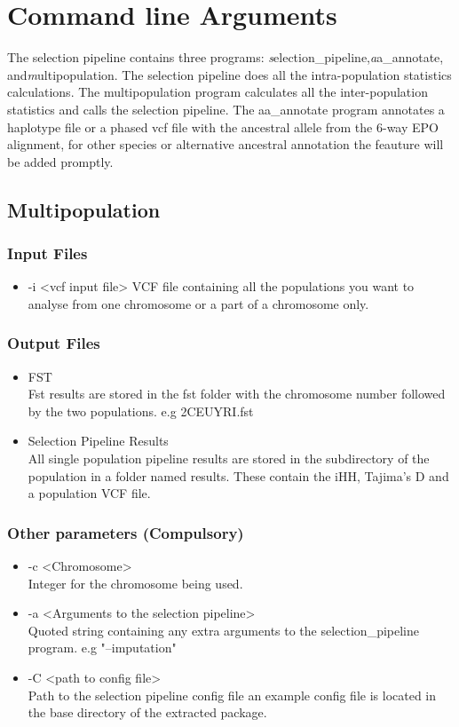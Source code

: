 \documentclass[a4paper,10pt]{article}
\begin{document}
\section{Command line Arguments}
The selection pipeline contains three programs: \emph selection\_pipeline,\emph aa\_annotate, and\emph multipopulation. The selection pipeline does all the intra-population statistics calculations. The multipopulation program calculates all the inter-population statistics and calls the selection pipeline. The aa\_annotate program annotates a haplotype file or a phased vcf file with the ancestral allele from the 6-way EPO alignment, for other species or alternative ancestral annotation the feauture will be added promptly.
\subsection{Multipopulation}
\subsubsection{Input Files}
\begin{itemize}
\item -i <vcf input file>
VCF file containing all the populations you want to analyse from one chromosome or a part of a chromosome only. 
\end{itemize}
\subsubsection{Output Files}
\begin{itemize}
\item FST \\
Fst results are stored in the fst folder with the chromosome number followed by the two populations. e.g 2CEUYRI.fst
\item Selection Pipeline Results\\
All single population pipeline results are stored in the subdirectory of the population in a folder named results. These contain the iHH, Tajima's D and a population VCF file.
\end{itemize}
\subsubsection{Other parameters (Compulsory)}
\begin{itemize}
\item -c <Chromosome>\\
Integer for the chromosome being used.
\item -a <Arguments to the selection pipeline>\\
Quoted string containing any extra arguments to the selection\_pipeline program. e.g "--imputation"
\item -C <path to config file>\\
Path to the selection pipeline config file an example config file is located in the base directory of the extracted package.
\end{itemize}
\end{document}

